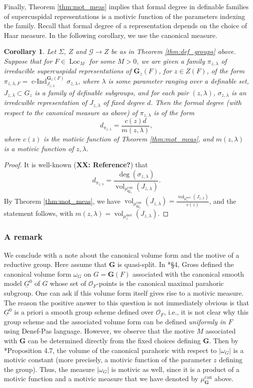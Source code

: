 \documentclass{amsart}
\newcommand{\ri}{\mathcal{O}}
\newcommand{\vol}{\operatorname{vol}}
\newcommand{\loc}{\operatorname{Loc}}
\newcommand{\ind}{\operatorname{c-Ind}}
\newcommand{\bG}{\mathbf{G}}
\newcommand{\can}{\mathrm{can}}
\newcommand{\cG}{\mathcal{G}}
\newcommand\mot{\mathrm{mot}}
\theoremstyle{plain}
\newtheorem{cor}[thm]{Corollary}
\theoremstyle{definition}
\begin{document}
Finally, Theorem \ref{thm:mot_meas} implies that formal degree in definable families of supercuspidal representations is a motivic function of the parameters indexing the family. 
Recall that formal degree of a representation depends on the choice of Haar measure. 
In the following corollary, we use the canonical measure. 
 
\begin{cor} Let $\Sigma$, $Z$  and $\cG \to Z$ be as in Theorem \ref{thm:def_groups} above. 
Suppose that for $F\in \loc_M$ for some $M>0$, we are given a family $\pi_{z, \lambda}$ of irreducible supercuspidal representations of $\bG_z(F)$, for $z\in Z(F)$, of the form 
$\pi_{z, \lambda,F} = \ind_{J_{z,\lambda}}^{\bG_z(F)} \sigma_{z, \lambda}$, 
where $\lambda$ is some parameter ranging over a definable set, $J_{z,\lambda}\subset G_z$ 
is a family of definable subgroups, and for each pair $(z, \lambda)$, $\sigma_{z,\lambda}$ is an irredcuible representation of $J_{z, \lambda}$ of fixed degree $d$. 
Then the formal degree (with respect to the canonical measure as above) of $\pi_{z, \lambda}$ is of the form 
$$d_{\pi_{z, \lambda}}=\frac{c(z)d}{m(z, \lambda)},$$ where
$c(z)$ is the motivic function of Theorem \ref{thm:mot_meas}, and $m(z, \lambda)$ is a  motivic function of $z, \lambda$. 
\end{cor}
\begin{proof}
It is well-known ({\bf XX: Reference?})  that
$$ d_{\pi_{z, \lambda}}=\frac{\deg(\sigma_{z, \lambda})}{\vol_{\mu_{\bG_z}^\can}(J_{z, \lambda})}.$$
By Theorem \ref{thm:mot_meas}, we have 
$\vol_{\mu_{\bG_z}^\can}(J_{z, \lambda}) = \frac{\vol_{\mu_z^\mot}(J_{z, \lambda})}{c(z)}$, and the statement follows, with $m(z, \lambda)=\vol_{\mu_z^\mot}(J_{z, \lambda})$.
\end{proof}

\subsubsection{A remark} We conclude with a note about the canonical volume form and the motive of a reductive group. 
Here assume that $\bG$ is quasi-split. In  \cite{gross:motive}*{\S 4}, Gross defined the canonical volume form $\omega_G$ on $G=\bG(F)$ associated with the canonical smooth model 
$\underline{G}^0$ of $G$ whose set of $\ri_F$-points is the canonical maximal parahoric subgroup. 
One can ask if this volume form itself gives rise to a motivic measure. 
The reason the positive answer to this question  is not immediately obvious is that $\underline{G}^0$ is a priori a smooth group scheme defined over $\ri_F$, i.e., it is not clear why this group scheme and the associated volume form can be defined \emph{uniformly in $F$} using Denef-Pas language. However, we observe that the motive $M$ associated with $\bG$ can be determined directly from the fixed choices defining $\bG$. Then by \cite{gross:motive}*{Proposition 4.7}, the volume of the canonical parahoric with respect to $|\omega_G|$ is a motivic constant (more precisely, a motivic function of the parameter $z$ defining the group).  
Thus, the measure $|\omega_G|$ is motivic as well, since it is a product of a motivic function and a motivic measure that we have denoted by $\mu_{\bG}^\can$ above. 
\end{document}
